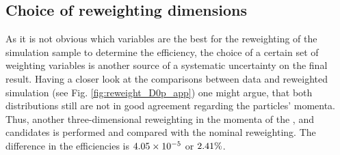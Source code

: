 \subsection{Choice of reweighting dimensions}
As it is not obvious which variables are the best for the reweighting of the \LbToDpmunuX simulation sample to determine the efficiency, the choice of a certain set of weighting variables is another source of a systematic uncertainty on the final result.
Having a closer look at the comparisons between data and reweighted simulation (see Fig. \ref{fig:reweight_D0p_app}) one might argue, that both distributions still are not in good agreement regarding the particles' momenta.
Thus, another three-dimensional reweighting in the momenta of the \Dz\proton\mun, \Dz\mun and \Dz candidates is performed and compared with the nominal reweighting.
The difference in the efficiencies \effDp is $\num{4.05e-05}$ or $2.41\%$.

